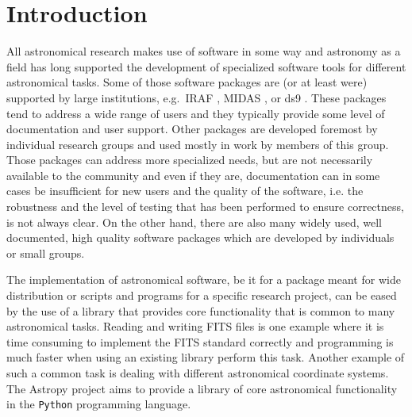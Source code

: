 \documentclass[modern]{aastex61}
\newcommand{\package}[1]{\texttt{#1}\xspace}
\newcommand{\python}{\package{Python}\xspace}
\newcommand{\astropy}{Astropy\xspace}
\begin{document}
\section{Introduction} \label{sec:intro}
All astronomical research makes use of software in some way and
astronomy as a field has long supported the development of specialized
software tools for different astronomical tasks. Some of those
software packages are (or at least were) supported by large
institutions, e.g.~IRAF \citep[developed at NOAO,][]{IRAF}, MIDAS
\citep[developed at ESO,][]{MIDAS}, or ds9 \citep[developed at
%
%
  SAO,][]{ds9}. These packages tend to address a wide range of users
and they typically provide some level of documentation and user
support. Other packages are developed foremost by individual research
groups and used mostly in work by members of this group. Those
packages can address more specialized needs, but are not necessarily
available to the community and even if they are, documentation can in
some cases be insufficient for new users and the quality of the
software, i.e. the robustness and the level of testing that has been
performed to ensure correctness, is not always clear. On the other
hand, there are also many widely used, well documented, high quality
software packages which are developed by individuals or small groups.

The implementation of astronomical software, be it for a package meant
for wide distribution or scripts and programs for a specific research
project, can be eased by the use of a library that provides core
functionality that is common to many astronomical tasks. Reading and
writing FITS files is one example where it is time
consuming to implement the FITS standard correctly and
programming is much faster when using an existing library perform this
task. Another example of such a common task is dealing with different
astronomical coordinate systems. The \astropy project aims to provide a
library of core astronomical functionality in the \python programming
language.
\end{document}
